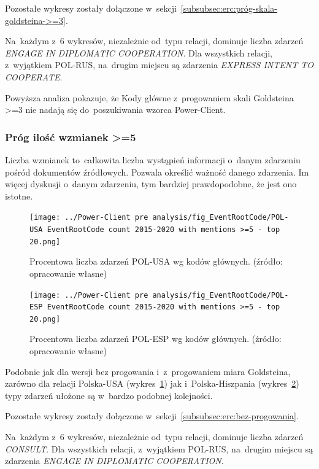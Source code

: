 \documentclass[11pt]{report}
\begin{document}
    Pozostałe wykresy zostały dołączone w~sekcji~\ref{subsubsec:erc:próg-skala-goldsteina->=3}.

    Na~każdym z~6 wykresów, niezależnie od~typu relacji, dominuje liczba zdarzeń \textit{ENGAGE IN DIPLOMATIC COOPERATION}.
    Dla wszystkich relacji, z~wyjątkiem POL-RUS, na~drugim miejscu są zdarzenia \textit{EXPRESS INTENT TO COOPERATE}.

    Powyższa analiza pokazuje, że Kody główne z~progowaniem skali Goldsteina >=3 nie nadają się do~poszukiwania wzorca Power-Client.

    \subsubsection{Próg ilość wzmianek >=5}
    Liczba wzmianek to~całkowita liczba wystąpień informacji o~danym zdarzeniu pośród dokumentów źródłowych.
    Pozwala określić ważność danego zdarzenia.
    Im więcej dyskusji o~danym zdarzeniu, tym bardziej prawdopodobne, że jest ono istotne.

    \begin{figure}[tp]
        \centering
        \texttt{[image: ../Power-Client pre analysis/fig\_EventRootCode/POL-USA EventRootCode count 2015-2020 with mentions >=5 - top 20.png]}
        \caption{Procentowa liczba zdarzeń POL-USA wg kodów głównych. (źródło: opracowanie własne)}
        \label{fig:Power-Client:ERC:Mentions:POL-USA}
    \end{figure}

    \begin{figure}[tp]
        \centering
        \texttt{[image: ../Power-Client pre analysis/fig\_EventRootCode/POL-ESP EventRootCode count 2015-2020 with mentions >=5 - top 20.png]}
        \caption{Procentowa liczba zdarzeń POL-ESP wg kodów głównych. (źródło: opracowanie własne)}
        \label{fig:Power-Client:ERC:Mentions:POL-ESP}
    \end{figure}

    Podobnie jak dla wersji bez progowania i~z~progowaniem miara Goldsteina, zarówno dla relacji Polska-USA (wykres~\ref{fig:Power-Client:ERC:Mentions:POL-USA}) jak i~Polska-Hiszpania (wykres~\ref{fig:Power-Client:ERC:Mentions:POL-ESP})
    typy zdarzeń ułożone są w~bardzo podobnej kolejności.

    Pozostałe wykresy zostały dołączone w~sekcji~\ref{subsubsec:erc:bez-progowania}.

    Na~każdym z~6 wykresów, niezależnie od~typu relacji, dominuje liczba zdarzeń \textit{CONSULT}.
    Dla wszystkich relacji, z~wyjątkiem POL-RUS, na~drugim miejscu są zdarzenia \textit{ENGAGE IN DIPLOMATIC COOPERATION}.
\end{document}
